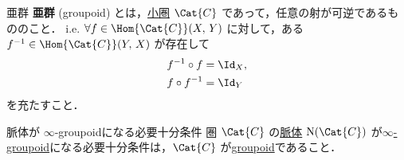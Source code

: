 \documentclass[TQFT_main]{subfiles}
\begin{document}
\begin{mydef}[label=def:groupoid]{亜群}
    \textbf{亜群} (groupoid) とは，\hyperref[def:category]{小圏} $\Cat{C}$ であって，任意の射が可逆であるもののこと．
    i.e. $\forall f \in \Hom{\Cat{C}} (X,\, Y)$ に対して，ある $f^{-1} \in \Hom{\Cat{C}} (Y,\, X)$ が存在して
    \begin{align}
        f^{-1} \circ f &= \Id_X, \\
        f \circ f^{-1} &= \Id_Y
    \end{align}
    を充たすこと．
\end{mydef}


\begin{myprop}[label=prop:nerve-grpd]{脈体が $\infty$-groupoidになる必要十分条件}
    圏 $\Cat{C}$ の\hyperref[def:nerve]{脈体} $\mathrm{N}(\Cat{C})$ が\hyperref[def:infinity-1]{$\infty$-groupoid}になる必要十分条件は，$\Cat{C}$ が\hyperref[def:groupoid]{groupoid}であること．
\end{myprop}
\end{document}
